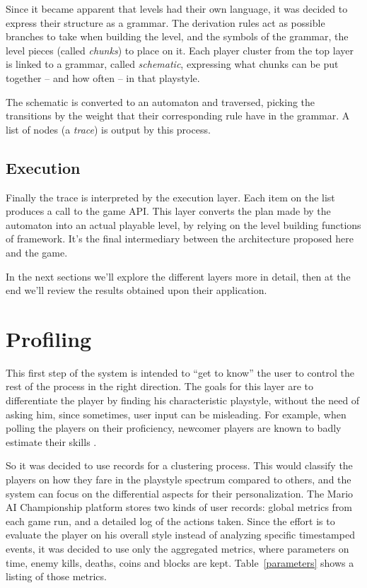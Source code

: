 \documentclass[conference]{IEEEtran}
\begin{document}
Since it became apparent that levels had their own language, it was decided to express their structure as a grammar. The derivation rules act as possible branches to take when building the level, and the symbols of the grammar, the level pieces (called \textit{chunks}) to place on it. Each player cluster from the top layer is linked to a grammar, called \textit{schematic}, expressing what chunks can be put together -- and how often -- in that playstyle. 

The schematic is converted to an automaton and traversed, picking the transitions by the weight that their corresponding rule have in the grammar. A list of nodes (a \textit{trace}) is output by this process.

\subsection{Execution}

Finally the trace is interpreted by the execution layer. Each item on the list produces a call to the game API. This layer converts the plan made by the automaton into an actual playable level, by relying on the level building functions of framework. It's the final intermediary between the architecture proposed here and the game.

In the next sections we'll explore the different layers more in detail, then at the end we'll review the results obtained upon their application.





\section{Profiling}
\label{overviewprofiling}

This first step of the system is intended to ``get to know'' the user to control the rest of the process in the right direction. The goals for this layer are to differentiate the player by finding his characteristic playstyle, without the need of asking him, since sometimes, user input can be misleading. For example, when polling the players on their proficiency, newcomer players are known to badly estimate their skills \cite{dunningkruger,skilled,overestimate}.

So it was decided to use records for a clustering process. This would classify the players on how they fare in the playstyle spectrum compared to others, and the system can focus on the differential aspects for their personalization. The Mario AI Championship platform stores two kinds of user records: global metrics from each game run, and a detailed log of the actions taken. Since the effort is to evaluate the player on his overall style instead of analyzing specific timestamped events, it was decided to use only the aggregated metrics, where parameters on time, enemy kills, deaths, coins and blocks are kept. Table~\ref{parameters} shows a listing of those metrics.
\end{document}
